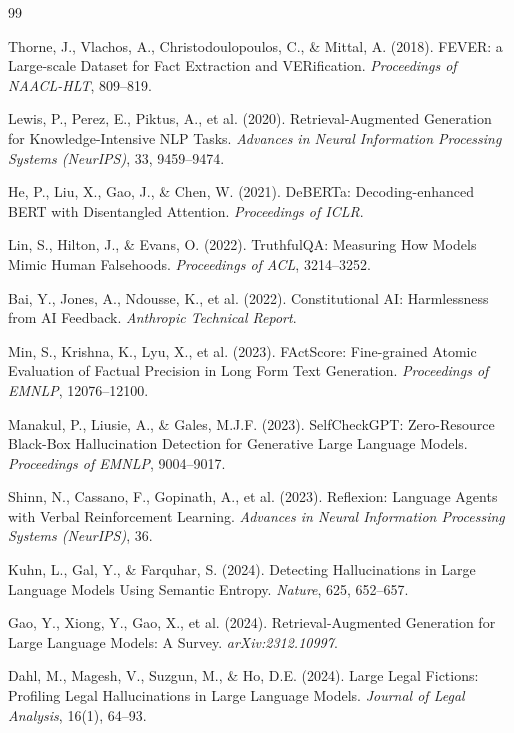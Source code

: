 \documentclass[12pt, a4paper, oneside]{report}
\begin{document}
\begin{thebibliography}{99}

Thorne, J., Vlachos, A., Christodoulopoulos, C., \& Mittal, A. (2018). FEVER: a Large-scale Dataset for Fact Extraction and VERification. \textit{Proceedings of NAACL-HLT}, 809--819.

Lewis, P., Perez, E., Piktus, A., et al. (2020). Retrieval-Augmented Generation for Knowledge-Intensive NLP Tasks. \textit{Advances in Neural Information Processing Systems (NeurIPS)}, 33, 9459--9474.

He, P., Liu, X., Gao, J., \& Chen, W. (2021). DeBERTa: Decoding-enhanced BERT with Disentangled Attention. \textit{Proceedings of ICLR}.

Lin, S., Hilton, J., \& Evans, O. (2022). TruthfulQA: Measuring How Models Mimic Human Falsehoods. \textit{Proceedings of ACL}, 3214--3252.

Bai, Y., Jones, A., Ndousse, K., et al. (2022). Constitutional AI: Harmlessness from AI Feedback. \textit{Anthropic Technical Report}.

Min, S., Krishna, K., Lyu, X., et al. (2023). FActScore: Fine-grained Atomic Evaluation of Factual Precision in Long Form Text Generation. \textit{Proceedings of EMNLP}, 12076--12100.

Manakul, P., Liusie, A., \& Gales, M.J.F. (2023). SelfCheckGPT: Zero-Resource Black-Box Hallucination Detection for Generative Large Language Models. \textit{Proceedings of EMNLP}, 9004--9017.

Shinn, N., Cassano, F., Gopinath, A., et al. (2023). Reflexion: Language Agents with Verbal Reinforcement Learning. \textit{Advances in Neural Information Processing Systems (NeurIPS)}, 36.

Kuhn, L., Gal, Y., \& Farquhar, S. (2024). Detecting Hallucinations in Large Language Models Using Semantic Entropy. \textit{Nature}, 625, 652--657.

Gao, Y., Xiong, Y., Gao, X., et al. (2024). Retrieval-Augmented Generation for Large Language Models: A Survey. \textit{arXiv:2312.10997}.

Dahl, M., Magesh, V., Suzgun, M., \& Ho, D.E. (2024). Large Legal Fictions: Profiling Legal Hallucinations in Large Language Models. \textit{Journal of Legal Analysis}, 16(1), 64--93.


\end{thebibliography}
\end{document}
